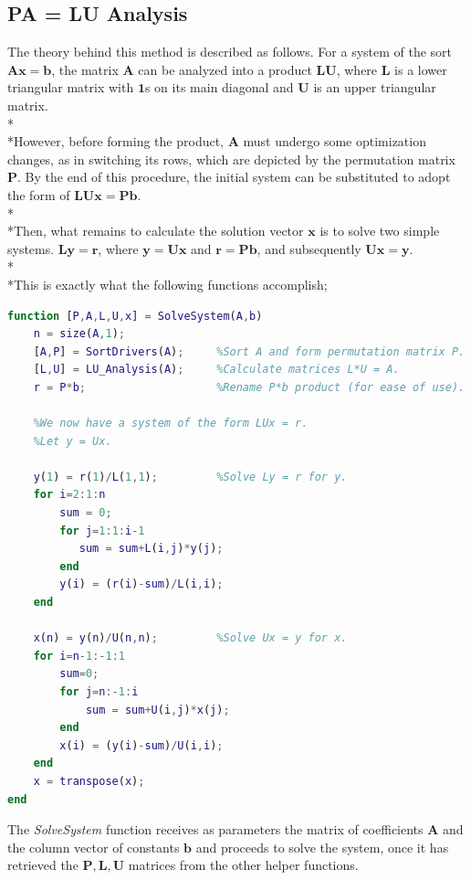 \documentclass{article}
\begin{document}
\subsection{PA = LU Analysis}
The theory behind this method is described as follows. For a system of the sort $\mathbf{Ax = b}$, the matrix $\mathbf{A}$ can be analyzed into a product $\mathbf{LU}$, where $\mathbf{L}$ is a lower triangular matrix with $\mathbf{1}$s on its main diagonal and $\mathbf{U}$ is an upper triangular matrix.
\\*\\*However, before forming the product, $\mathbf{A}$ must undergo some optimization changes, as in switching its rows, which are depicted by the permutation matrix $\mathbf{P}$. By the end of this procedure, the initial system can be substituted to adopt the form of $\mathbf{LUx = Pb}$.
\\*\\*Then, what remains to calculate the solution vector $\mathbf{x}$ is to solve two simple systems. $\mathbf{Ly = r}$, where $\mathbf{y = Ux}$ and $\mathbf{r = Pb}$, and subsequently $\mathbf{Ux = y}$.
\\*\\*This is exactly what the following functions accomplish;
\begin{lstlisting}[language=Matlab]
function [P,A,L,U,x] = SolveSystem(A,b)
    n = size(A,1);                      
    [A,P] = SortDrivers(A);     %Sort A and form permutation matrix P.
    [L,U] = LU_Analysis(A);     %Calculate matrices L*U = A.
    r = P*b;                    %Rename P*b product (for ease of use).
    
    %We now have a system of the form LUx = r.
    %Let y = Ux.
    
    y(1) = r(1)/L(1,1);         %Solve Ly = r for y.
    for i=2:1:n
        sum = 0;
        for j=1:1:i-1
           sum = sum+L(i,j)*y(j); 
        end
        y(i) = (r(i)-sum)/L(i,i);
    end
    
    x(n) = y(n)/U(n,n);         %Solve Ux = y for x.
    for i=n-1:-1:1
        sum=0;
        for j=n:-1:i
            sum = sum+U(i,j)*x(j);
        end
        x(i) = (y(i)-sum)/U(i,i);
    end
    x = transpose(x);
end
\end{lstlisting}
\pagebreak
The \emph{SolveSystem} function receives as parameters the matrix of coefficients $\mathbf{A}$ and the column vector of constants $\mathbf{b}$ and proceeds to solve the system, once it has retrieved the $\mathbf{P,L,U}$ matrices from the other helper functions.
\end{document}
